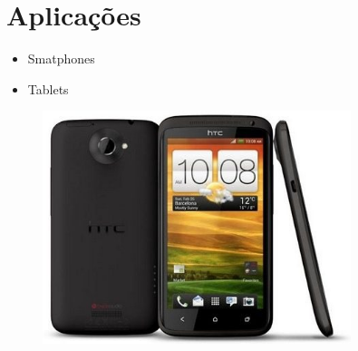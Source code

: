 \documentclass{beamer}
\begin{document}
\section{Aplica\c{c}\~oes}
\begin{frame}
  \begin{itemize}
    \item Smatphones
    \item Tablets
  \end{itemize}
  \begin{figure}
    \centering
    \includegraphics[width=9.0cm]{./pictures/htcTegra3.png}
  \end{figure}
\end{frame}

    
\end{document}
